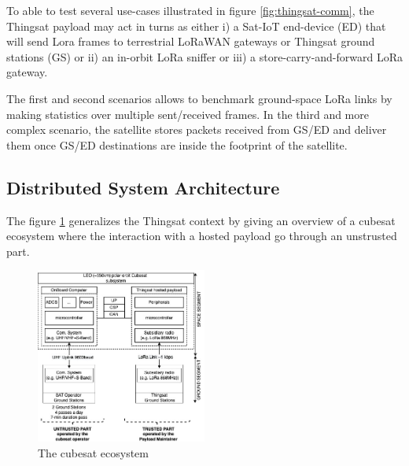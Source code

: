 To able to test several use-cases illustrated in figure \ref{fig:thingsat-comm},
the Thingsat payload may act in turns as either i) a Sat-IoT end-device (ED)
that will send Lora frames to terrestrial LoRaWAN gateways or Thingsat ground
stations (GS) or ii) an in-orbit LoRa sniffer or iii) a store-carry-and-forward
LoRa gateway.

The first and second scenarios allows to benchmark ground-space LoRa links by
making statistics over multiple sent/received frames. In the third and more
complex scenario, the satellite stores packets received from GS/ED and deliver
them once GS/ED destinations are inside the footprint of the satellite.


\subsection{Distributed System Architecture}

The figure \ref{fig:archi} generalizes the Thingsat context by giving an
overview of a cubesat ecosystem where the interaction with a hosted payload go
through an unstrusted part.

\begin{figure}[ht]
    \includegraphics[width=0.5\textwidth]{Figures/globecom-thingsat.jpg}
    \caption{The cubesat ecosystem}
    \label{fig:archi}
\end{figure}

